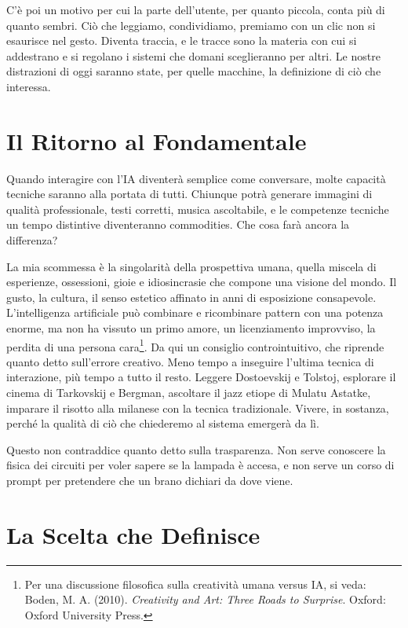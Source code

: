 C'è poi un motivo per cui la parte dell'utente, per quanto piccola, conta più di quanto sembri. Ciò che leggiamo, condividiamo, premiamo con un clic non si esaurisce nel gesto. Diventa traccia, e le tracce sono la materia con cui si addestrano e si regolano i sistemi che domani sceglieranno per altri. Le nostre distrazioni di oggi saranno state, per quelle macchine, la definizione di ciò che interessa.

\section{Il Ritorno al Fondamentale}

Quando interagire con l'IA diventerà semplice come conversare, molte capacità tecniche saranno alla portata di tutti. Chiunque potrà generare immagini di qualità professionale, testi corretti, musica ascoltabile, e le competenze tecniche un tempo distintive diventeranno commodities. Che cosa farà ancora la differenza?

La mia scommessa è la singolarità della prospettiva umana, quella miscela di esperienze, ossessioni, gioie e idiosincrasie che compone una visione del mondo. Il gusto, la cultura, il senso estetico affinato in anni di esposizione consapevole. L'intelligenza artificiale può combinare e ricombinare pattern con una potenza enorme, ma non ha vissuto un primo amore, un licenziamento improvviso, la perdita di una persona cara\footnote{Per una discussione filosofica sulla creatività umana versus IA, si veda: Boden, M. A. (2010). \textit{Creativity and Art: Three Roads to Surprise}. Oxford: Oxford University Press.}. Da qui un consiglio controintuitivo, che riprende quanto detto sull'errore creativo. Meno tempo a inseguire l'ultima tecnica di interazione, più tempo a tutto il resto. Leggere Dostoevskij e Tolstoj, esplorare il cinema di Tarkovskij e Bergman, ascoltare il jazz etiope di Mulatu Astatke, imparare il risotto alla milanese con la tecnica tradizionale. Vivere, in sostanza, perché la qualità di ciò che chiederemo al sistema emergerà da lì.

Questo non contraddice quanto detto sulla trasparenza. Non serve conoscere la fisica dei circuiti per voler sapere se la lampada è accesa, e non serve un corso di prompt per pretendere che un brano dichiari da dove viene.

\section{La Scelta che Definisce}


